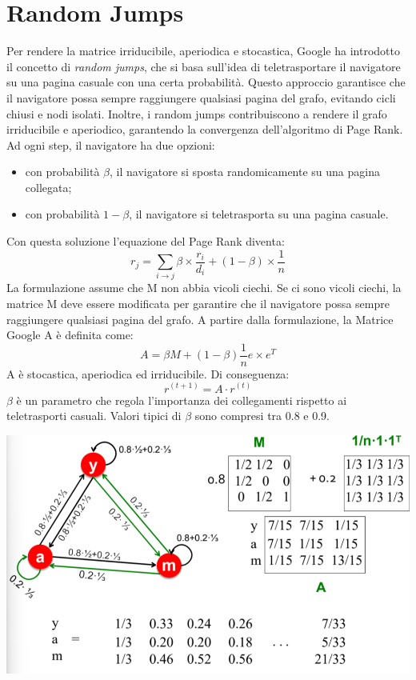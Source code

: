 \documentclass{report}
\begin{document}
	\section{Random Jumps}
	Per rendere la matrice irriducibile, aperiodica e stocastica, Google ha introdotto il concetto di \textit{random jumps}, che si basa sull'idea di teletrasportare il navigatore su una pagina casuale con una certa probabilità. Questo approccio garantisce che il navigatore possa sempre raggiungere qualsiasi pagina del grafo, evitando cicli chiusi e nodi isolati. Inoltre, i random jumps contribuiscono a rendere il grafo irriducibile e aperiodico, garantendo la convergenza dell'algoritmo di Page Rank.
	Ad ogni step, il navigatore ha due opzioni:
	\begin{itemize}
		\item con probabilità $\beta$, il navigatore si sposta randomicamente su una pagina collegata;
		\item con probabilità $1-\beta$, il navigatore si teletrasporta su una pagina casuale.
	\end{itemize}
	Con questa soluzione l'equazione del Page Rank diventa:
	\[
	r_j = \sum_{i \rightarrow j} \beta \times \frac{r_i}{d_i} + (1-\beta) \times \frac{1}{n}
	\]
	La formulazione assume che M non abbia vicoli ciechi. Se ci sono vicoli ciechi, la matrice M deve essere modificata per garantire che il navigatore possa sempre raggiungere qualsiasi pagina del grafo.
	A partire dalla formulazione, la Matrice Google A è definita come:
	\[
	A = \beta M + (1-\beta) \frac{1}{n}e \times e^T
	\]
	A è stocastica, aperiodica ed irriducibile. Di conseguenza:
	\[
	r^{(t+1)} = A \cdot r^{(t)}
	\]
	$\beta$ è un parametro che regola l'importanza dei collegamenti rispetto ai teletrasporti casuali. Valori tipici di $\beta$ sono compresi tra 0.8 e 0.9.
	\begin{center}
		\includegraphics[scale=0.5]{assets/page-rank-random-tp.png}
	\end{center}
\end{document}
